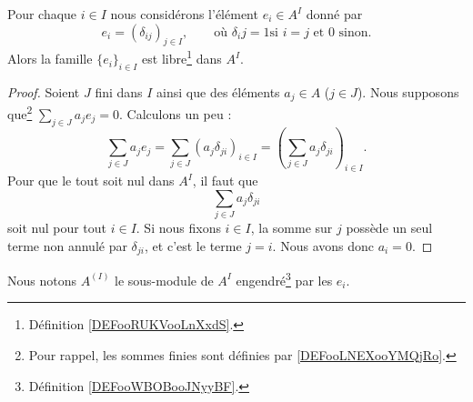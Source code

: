 \begin{lemma}
    Pour chaque \( i\in I\) nous considérons l'élément \( e_i\in A^I\) donné par
    \begin{equation}
        e_i=(\delta_{ij})_{j\in I}, \qquad\text{où } \delta_ij = 1 \text{si } i = j \text{ et } 0 \text{ sinon.}
    \end{equation}
    Alors la famille \( \{ e_i \}_{i\in I}\) est libre\footnote{Définition \ref{DEFooRUKVooLnXxdS}.} dans \( A^I\).
\end{lemma}

\begin{proof}
    Soient \( J\) fini dans \( I\) ainsi que des éléments \( a_j\in A\) (\( j\in J\)). Nous supposons que\footnote{Pour rappel, les sommes finies sont définies par \ref{DEFooLNEXooYMQjRo}.} \( \sum_{j\in J}a_je_j=0\). Calculons un peu :
    \begin{equation}
        \sum_{j\in J}a_je_j=\sum_{j\in J}(a_j\delta_{ji})_{i\in I}=\left( \sum_{j\in J}a_j\delta_{ji} \right)_{i\in I}.
    \end{equation}
    Pour que le tout soit nul dans \( A^I\), il faut que
    \begin{equation}
        \sum_{j\in J}a_j\delta_{ji}
    \end{equation}
    soit nul pour tout \( i\in I\). Si nous fixons \( i\in I\), la somme sur \( j\) possède un seul terme non annulé par \( \delta_{ji}\), et c'est le terme \( j=i\). Nous avons donc \( a_i=0\).
\end{proof}

\begin{definition}      \label{DEFooBMEPooFsCHgb}
    Nous notons \( A^{(I)}\) le sous-module de \( A^I\) engendré\footnote{Définition \ref{DEFooWBOBooJNyyBF}.} par les \( e_i\).
\end{definition}



